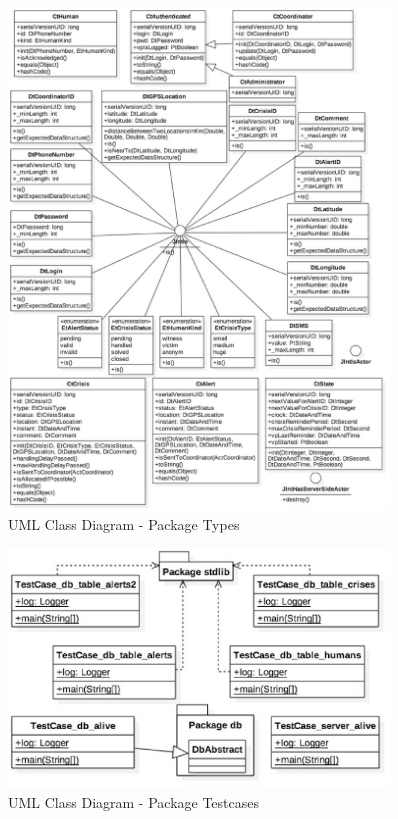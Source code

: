 \begin{figure}[h!]
	\centering
	\includegraphics[width=0.9\textwidth]{./images/dcm_types.eps}
	\caption{UML Class Diagram - Package Types}
\end{figure}

\begin{figure}[h!]
	\centering
	\includegraphics[width=0.9\textwidth]{./images/dcm_testcases.eps}
	\caption{UML Class Diagram - Package Testcases}
\end{figure}

